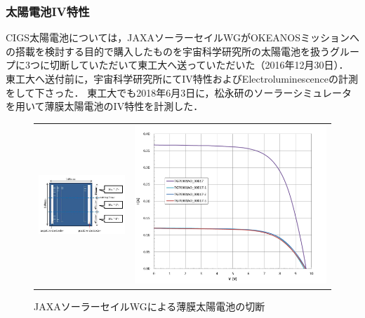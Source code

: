 \subsubsection*{太陽電池IV特性}
CIGS太陽電池については，JAXAソーラーセイルWGがOKEANOSミッションへの搭載を検討する目的で購入したものを宇宙科学研究所の太陽電池を扱うグループに3つに切断していただいて東工大へ送っていただいた（2016年12月30日）．
東工大へ送付前に，宇宙科学研究所にてIV特性およびElectroluminescenceの計測をして下さった．
東工大でも2018年6月3日に，松永研のソーラーシミュレータを用いて薄膜太陽電池のIV特性を計測した．
	\begin{figure}[H]
	\begin{tabular}{cc}
		\begin{minipage}[t]{0.5\hsize}
			\centering
			\includegraphics[width=1\textwidth]{03/fig/3-9-3-12.jpg}
		\end{minipage} &
		
		\begin{minipage}[t]{0.5\hsize}
			\centering
			\includegraphics[width=1\textwidth]{03/fig/3-9-3-13.png}
		\end{minipage}
	\end{tabular}	
			\caption{JAXAソーラーセイルWGによる薄膜太陽電池の切断}
\label{fig3-9-3-12}
\end{figure}
